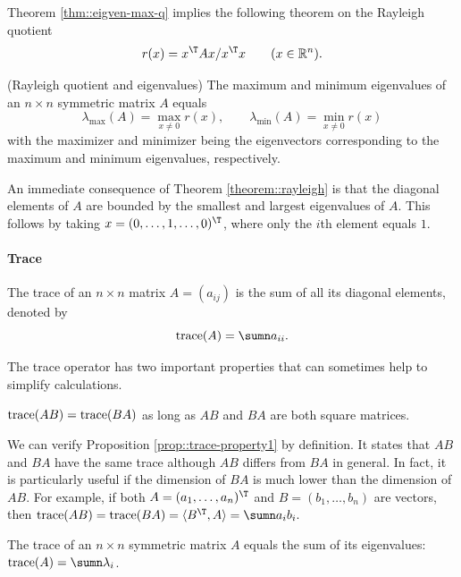 Theorem \ref{thm::eigven-max-q} implies the following theorem on the  Rayleigh quotient
$$
r(x)=x^{\T}Ax/x^{\T}x \qquad  (x\in \mathbb{R}^n).
$$


\begin{theorem}
(Rayleigh quotient and eigenvalues) \label{theorem::rayleigh}
The maximum and minimum eigenvalues of  an $n\times n$ symmetric matrix $A$ equals
\[
\lambda_{\max}(A)=\max_{x\neq0}r(x),\qquad\lambda_{\min}(A)=\min_{x\neq0}r(x)
\]
with the maximizer and minimizer being the eigenvectors corresponding to the maximum and minimum eigenvalues, respectively. 
\end{theorem}

An immediate consequence of Theorem \ref{theorem::rayleigh} is that the diagonal elements of $A$ are bounded by the smallest and largest eigenvalues of $A$. This follows by taking $x = (0, \ldots, 1, \ldots, 0)^{\T}$, where only the $i$th element equals $1$. 

\paragraph*{Trace}

The trace of an $n\times n$ matrix $A=(a_{ij})$ is the sum of all
its diagonal elements, denoted by 
$$
\text{trace}(A)=\sumn a_{ii}.
$$

The trace operator has two important properties that can sometimes
help to simplify calculations.

\begin{proposition}\label{prop::trace-property1}
$\textup{trace}(AB)=\textup{trace}(BA)$ as long as $AB$ and $BA$
are both square matrices.
\end{proposition}

We can verify
Proposition \ref{prop::trace-property1} by definition. It states that $AB$ and $BA$ have the same trace although $AB$ differs from $BA$ in general. In fact, it is particularly useful if the dimension of $BA$
is much lower than the dimension of $AB$. For example, if both $A=(a_{1},\ldots,a_{n})^{\T}$
and $B=(b_{1},\ldots,b_{n})$ are vectors, then $\text{trace}(AB)=\text{trace}(BA)=\langle B^{\T},A \rangle =\sumn a_{i}b_{i}.$ 

\begin{proposition}\label{proposition::trace-eigenvalues}
The trace of an $n\times n$ symmetric matrix $A$ equals the sum
of its eigenvalues: $\textup{trace}(A)=\sumn\lambda_{i}$. 
\end{proposition}

